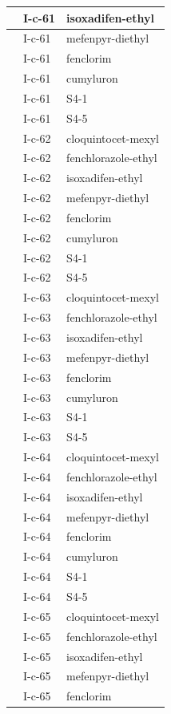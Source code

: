 \documentclass[11pt,a4paper]{article}
\begin{document}
\begin{table}[h]
\begin{tabular}{|l|l|l|}
 & I-c-61 & isoxadifen-ethyl \\ \hline
 & I-c-61 & mefenpyr-diethyl \\ \hline
 & I-c-61 & fenclorim \\ \hline
 & I-c-61 & cumyluron \\ \hline
 & I-c-61 & S4-1 \\ \hline
 & I-c-61 & S4-5 \\ \hline
 & I-c-62 & cloquintocet-mexyl \\ \hline
 & I-c-62 & fenchlorazole-ethyl \\ \hline
 & I-c-62 & isoxadifen-ethyl \\ \hline
 & I-c-62 & mefenpyr-diethyl \\ \hline
 & I-c-62 & fenclorim \\ \hline
 & I-c-62 & cumyluron \\ \hline
 & I-c-62 & S4-1 \\ \hline
 & I-c-62 & S4-5 \\ \hline
 & I-c-63 & cloquintocet-mexyl \\ \hline
 & I-c-63 & fenchlorazole-ethyl \\ \hline
 & I-c-63 & isoxadifen-ethyl \\ \hline
 & I-c-63 & mefenpyr-diethyl \\ \hline
 & I-c-63 & fenclorim \\ \hline
 & I-c-63 & cumyluron \\ \hline
 & I-c-63 & S4-1 \\ \hline
 & I-c-63 & S4-5 \\ \hline
 & I-c-64 & cloquintocet-mexyl \\ \hline
 & I-c-64 & fenchlorazole-ethyl \\ \hline
 & I-c-64 & isoxadifen-ethyl \\ \hline
 & I-c-64 & mefenpyr-diethyl \\ \hline
 & I-c-64 & fenclorim \\ \hline
 & I-c-64 & cumyluron \\ \hline
 & I-c-64 & S4-1 \\ \hline
 & I-c-64 & S4-5 \\ \hline
 & I-c-65 & cloquintocet-mexyl \\ \hline
 & I-c-65 & fenchlorazole-ethyl \\ \hline
 & I-c-65 & isoxadifen-ethyl \\ \hline
 & I-c-65 & mefenpyr-diethyl \\ \hline
 & I-c-65 & fenclorim \\ \hline

\end{tabular}
\end{table}
\end{document}
